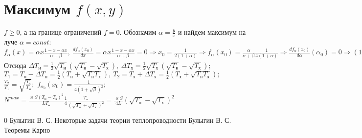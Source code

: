 \documentclass[a4paper]{article}
\begin{document}
\section{Максимум $f(x,y)$}
\label{maxsection}
$f\geq 0$, а на границе ограничений $f=0$. Обозначим $\alpha=\frac{y}{x}$ и найдем максимум на луче $\alpha=const$:\newline
$
f_\alpha(x)=\alpha x \frac{1-x-\alpha x}{\alpha + \beta},\ \frac{df_\alpha(x_0)}{dx}=\alpha x \frac{1-x-\alpha x}{\alpha + \beta}=0 \Longrightarrow x_0=\frac{1}{2(1+\alpha)} \Longrightarrow f_\alpha(x_0)=\frac{\alpha}{\alpha + \beta}\frac{1}{4(1+\alpha)}\Longrightarrow
\frac{df_\alpha(x_0)}{d\alpha}(\alpha_0)=0\Longrightarrow (1+\alpha)(\alpha+\beta)-\alpha(2\alpha+\beta+1)=0\Longrightarrow\alpha=\sqrt{\beta},\ 
x_0=\frac{1}{2(1+\sqrt{\beta})},\ y_0=\frac{\sqrt{\beta}}{2(1+\sqrt{\beta})}.$\newline
Отсюда\newline
$ %
\Delta T_{\text{н}}=\frac{1}{2}\sqrt{T_{\text{н}}}(\sqrt{T_{\text{н}}}-\sqrt{T_{\text{х}}}),\ 
\Delta T_{\text{х}}=\frac{1}{2}\sqrt{T_{\text{х}}}(\sqrt{T_{\text{н}}}-\sqrt{T_{\text{х}}});
$\newline 
$
T_1=T_{\text{н}}-\Delta T_{\text{н}}=\frac{1}{2}(T_{\text{н}}+\sqrt{T_{\text{н}}T_{\text{х}}}),\ 
T_2=T_{\text{х}}+\Delta T_{\text{х}}=\frac{1}{2}(T_{\text{х}}+\sqrt{T_{\text{н}}T_{\text{х}}});
$\newline
$\frac{T_2}{T_1}=\sqrt{\frac{T_{\text{х}}}{T_{\text{н}}}};$\newline
$f_{\alpha_0}(x_0)=\frac{1}{4(1+\sqrt{\beta})^2};$\newline
$N^{max}=\frac{\varkappa S(T_{\text{н}}-T_{\text{х}})^2}{LT_{\text{н}}}\frac{1}{4}\frac{T_{\text{н}}}{(\sqrt{T_{\text{н}}}+\sqrt{T_{\text{х}}})^2}=
\frac{\varkappa S}{4L}(\sqrt{T_{\text{н}}}-\sqrt{T_{\text{х}}})^2$

\begin{thebibliography}{0}
\bibitem{b1} Булыгин В. С. Некоторые задачи теории теплопроводности
 Булыгин В. С. Теоремы Карно
\end{thebibliography}
\end{document}
